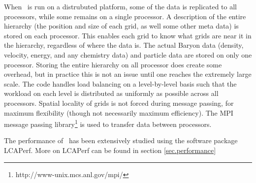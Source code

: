 When \enzo\ is run on a distrubuted platform, some of the data is
replicated to all processors, while some remains on a single processor.
A description of the entire hierarchy (the position and size of each grid, as well
some other meta data) is stored on each processor.  This enables each
grid to know what grids are near it in the hierarchy, regardless of
where the data is.  The actual Baryon data (density, velocity, energy,
and any chemistry data) and particle data are stored on only one
processor.  Storing the entire hierarchy on all processor does create
some overhead, but in practice this is not an issue until one reaches
the extremely large scale.
  The code handles load balancing 
on a level-by-level basis such that the workload on each level is 
distributed as uniformly as possible across all processors.  Spatial locality of 
grids is not forced during message passing, for maximum flexibility (though not
necessarily maximum efficiency).  
The MPI message passing library\footnote{http://www-unix.mcs.anl.gov/mpi/}
 is used to transfer data between processors.

The performance of \enzo\ has been extensively studied using the
software package LCAPerf.  More on LCAPerf can be found in section
\ref{sec.performance} 


